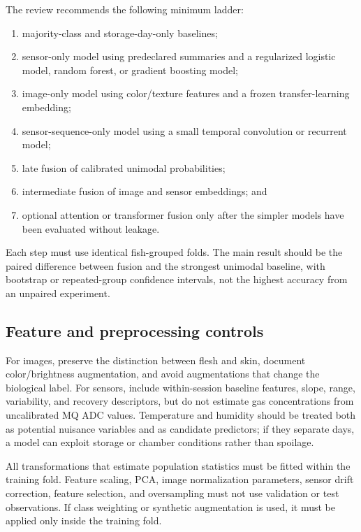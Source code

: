 \documentclass[11pt]{article}
\begin{document}
The review recommends the following minimum ladder:
\begin{enumerate}[leftmargin=*,itemsep=2pt]
  \item majority-class and storage-day-only baselines;
  \item sensor-only model using predeclared summaries and a regularized logistic model, random forest, or gradient boosting model;
  \item image-only model using color/texture features and a frozen transfer-learning embedding;
  \item sensor-sequence-only model using a small temporal convolution or recurrent model;
  \item late fusion of calibrated unimodal probabilities;
  \item intermediate fusion of image and sensor embeddings; and
  \item optional attention or transformer fusion only after the simpler models have been evaluated without leakage.
\end{enumerate}

Each step must use identical fish-grouped folds. The main result should be the paired difference between fusion and the strongest unimodal baseline, with bootstrap or repeated-group confidence intervals, not the highest accuracy from an unpaired experiment.

\subsection{Feature and preprocessing controls}

For images, preserve the distinction between flesh and skin, document color/brightness augmentation, and avoid augmentations that change the biological label. For sensors, include within-session baseline features, slope, range, variability, and recovery descriptors, but do not estimate gas concentrations from uncalibrated MQ ADC values. Temperature and humidity should be treated both as potential nuisance variables and as candidate predictors; if they separate days, a model can exploit storage or chamber conditions rather than spoilage.

All transformations that estimate population statistics must be fitted within the training fold. Feature scaling, PCA, image normalization parameters, sensor drift correction, feature selection, and oversampling must not use validation or test observations. If class weighting or synthetic augmentation is used, it must be applied only inside the training fold.
\end{document}
